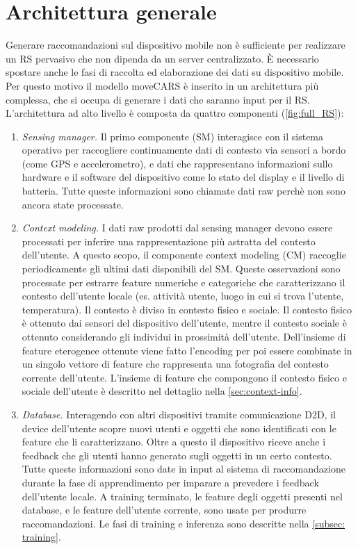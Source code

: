 \documentclass[12pt,italian]{report}
\begin{document}
\section{Architettura generale}
Generare raccomandazioni sul dispositivo mobile non è sufficiente per realizzare un RS pervasivo che non dipenda da un server centralizzato.  \`E necessario spostare anche le fasi di raccolta ed elaborazione dei dati su dispositivo mobile. Per questo motivo il modello moveCARS è inserito in un architettura più complessa, che si occupa di generare i dati che saranno input per il RS.
L'architettura ad alto livello è composta da quattro componenti (\autoref{fig:full_RS}):
\begin{enumerate}
 \item \textit{Sensing manager.} Il primo componente (SM) interagisce con il sistema operativo per raccogliere continuamente dati di contesto via sensori a bordo (come GPS e accelerometro), e dati che rappresentano informazioni sullo hardware e il software del dispositivo come lo stato del display e il livello di batteria. Tutte queste informazioni sono chiamate dati raw perchè non sono ancora state processate.
 
 \item \textit{Context modeling.} I dati raw prodotti dal sensing manager devono essere processati per inferire una rappresentazione più astratta del contesto dell'utente. A questo scopo, il componente context modeling (CM) raccoglie periodicamente gli ultimi dati disponibili del SM. Queste osservazioni sono processate per estrarre feature numeriche e categoriche che caratterizzano il contesto dell'utente locale (es. attività utente, luogo in cui si trova l'utente, temperatura). Il contesto è diviso in contesto fisico e sociale. Il contesto fisico è ottenuto  dai sensori del dispositivo dell'utente, mentre il contesto sociale è ottenuto considerando gli individui in prossimità dell'utente. Dell'insieme di feature eterogenee ottenute viene fatto l'encoding per poi essere combinate in un singolo vettore di feature che rappresenta una fotografia del contesto corrente dell'utente. L'insieme di feature che compongono il contesto fisico e sociale dell'utente è descritto nel dettaglio nella \autoref{sec:context-info}.
 
 \item  \textit{Database.} Interagendo con altri dispositivi tramite comunicazione D2D, il device dell'utente scopre nuovi utenti e oggetti che sono identificati con le feature che li caratterizzano. Oltre a questo il dispositivo riceve anche i feedback che gli utenti hanno generato sugli oggetti in un certo contesto. Tutte queste informazioni sono date in input al sistema di raccomandazione durante la fase di apprendimento per imparare a prevedere i feedback dell'utente locale. A training terminato, le feature degli oggetti presenti nel database, e le feature dell'utente corrente, sono usate per produrre raccomandazioni. Le fasi di training e inferenza sono descritte nella \autoref{subsec: training}.
 

\end{enumerate}
\end{document}

